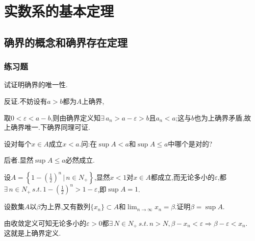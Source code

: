 \documentclass[cn,chinese,fontset]{elegantbook}
\begin{document}
    \chapter{实数系的基本定理}
        \section{确界的概念和确界存在定理}
            \subsection{练习题}
            \begin{exercise}
                试证明确界的唯一性.
            \end{exercise}
            \begin{solution}
                反证.不妨设有$a>b$都为$A$上确界,

                取$0<\varepsilon<a-b$,则由确界定义知$\exists\, a_n>a-\varepsilon>b$且$a_n<a$;这与$b$也为上确界矛盾,故上确界唯一.下确界同理可证.
            \end{solution}

            \begin{exercise}
                设对每个$x\in A$成立$x<a$.问:在$\sup A<a$和$\sup A\leqslant a$中哪个是对的?
            \end{exercise}
            
            \begin{solution}
                后者.显然$\sup A\leqslant a$必然成立.

                设$A=\left\{1-(\frac{1}{2})^n\,\bigg\lvert\,n\in N_+\right\}$,显然$x<1$对$x\in A$都成立,而无论多小的$\varepsilon$,都$\exists\,n\in N_+\,s.t.\,1-(\frac{1}{2})^n>1-\varepsilon$,即$\sup A=1$.
            \end{solution}

            \begin{exercise}
                设数集$A$以$\beta$为上界,又有数列$\{x_n\}\subset A$和$\lim_{n\to\infty}x_n=\beta.$证明$\beta=\sup A$.
            \end{exercise}
            
            \begin{solution}
                由收敛定义可知无论多小的$\varepsilon>0$都$\exists\,N\in N_+\,s.t.\,n>N,\beta-x_n<\varepsilon\Rightarrow\beta-\varepsilon<x_n$.这就是上确界定义.
            \end{solution}
\end{document}
